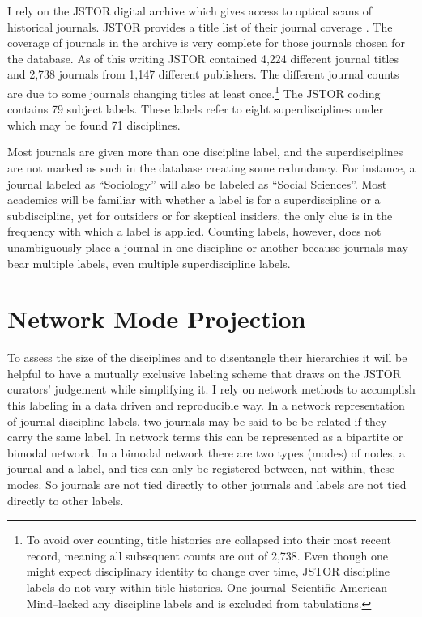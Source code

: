 \documentclass[]{book}
\let\rmarkdownfootnote\footnote%
\def\footnote{\protect\rmarkdownfootnote}
\theoremstyle{definition}
\theoremstyle{definition}
\theoremstyle{definition}
\theoremstyle{remark}
\begin{document}
I rely on the JSTOR digital archive which gives access to optical scans
of historical journals. JSTOR provides a title list of their journal
coverage \citep{JSTOR2018Title}. The coverage of journals in the archive
is very complete for those journals chosen for the database. As of this
writing JSTOR contained 4,224 different journal titles and 2,738
journals from 1,147 different publishers. The different journal counts
are due to some journals changing titles at least once.\footnote{To
  avoid over counting, title histories are collapsed into their most
  recent record, meaning all subsequent counts are out of 2,738. Even
  though one might expect disciplinary identity to change over time,
  JSTOR discipline labels do not vary within title histories. One
  journal--Scientific American Mind--lacked any discipline labels and is
  excluded from tabulations.} The JSTOR coding contains 79 subject
labels. These labels refer to eight superdisciplines under which may be
found 71 disciplines.

Most journals are given more than one discipline label, and the
superdisciplines are not marked as such in the database creating some
redundancy. For instance, a journal labeled as ``Sociology'' will also
be labeled as ``Social Sciences''. Most academics will be familiar with
whether a label is for a superdiscipline or a subdiscipline, yet for
outsiders or for skeptical insiders, the only clue is in the frequency
with which a label is applied. Counting labels, however, does not
unambiguously place a journal in one discipline or another because
journals may bear multiple labels, even multiple superdiscipline labels.

\hypertarget{network-mode-projection}{%
\section{Network Mode Projection}\label{network-mode-projection}}

To assess the size of the disciplines and to disentangle their
hierarchies it will be helpful to have a mutually exclusive labeling
scheme that draws on the JSTOR curators' judgement while simplifying it.
I rely on network methods to accomplish this labeling in a data driven
and reproducible way. In a network representation of journal discipline
labels, two journals may be said to be be related if they carry the same
label. In network terms this can be represented as a bipartite or
bimodal network. In a bimodal network there are two types (modes) of
nodes, a journal and a label, and ties can only be registered between,
not within, these modes. So journals are not tied directly to other
journals and labels are not tied directly to other labels.
\end{document}
